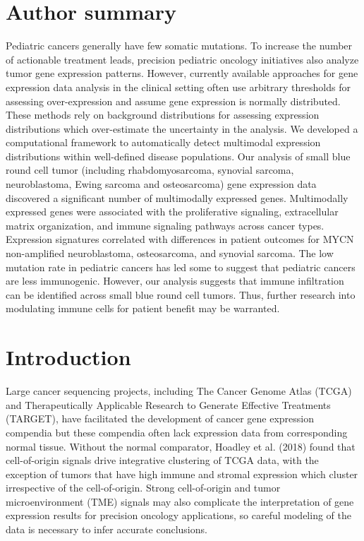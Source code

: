 \documentclass[10pt,letterpaper]{article}
\begin{document}
\section*{Author summary}
Pediatric cancers generally have few somatic mutations. To increase the number of actionable treatment leads, precision pediatric oncology initiatives also analyze tumor gene expression patterns. However, currently available approaches for gene expression data analysis in the clinical setting often use arbitrary thresholds for assessing over-expression and assume gene expression is normally distributed. These methods rely on background distributions for assessing expression distributions which over-estimate the uncertainty in the analysis. We developed a computational framework to automatically detect multimodal expression distributions within well-defined disease populations. Our analysis of small blue round cell tumor (including rhabdomyosarcoma, synovial sarcoma, neuroblastoma, Ewing sarcoma and osteosarcoma) gene expression data discovered a significant number of multimodally expressed genes. Multimodally expressed genes were associated with the proliferative signaling, extracellular matrix organization, and immune signaling pathways across cancer types. Expression signatures correlated with differences in patient outcomes for MYCN non-amplified neuroblastoma, osteosarcoma, and synovial sarcoma. The low mutation rate in pediatric cancers has led some to suggest that pediatric cancers are less immunogenic. However, our analysis suggests that immune infiltration can be identified across small blue round cell tumors. Thus, further research into modulating immune cells for patient benefit may be warranted.

\linenumbers

\section*{Introduction}
Large cancer sequencing projects, including The Cancer Genome Atlas (TCGA) and Therapeutically Applicable Research to Generate Effective Treatments (TARGET), have facilitated the development of cancer gene expression compendia \cite{vivianToilEnablesReproducible2017, pughGeneticLandscapeHighrisk2013, goldmanUCSCXenaPlatform2018, thecancergenomeatlasresearchnetworkCancerGenomeAtlas2013, newtonTumorMapExploringMolecular2017, vaskeComparativeTumorRNA2019} but these compendia often lack expression data from corresponding normal tissue. Without the normal comparator, Hoadley et al. (2018) found that cell-of-origin signals drive integrative clustering of TCGA data, with the exception of tumors that have high immune and stromal expression which cluster irrespective of the cell-of-origin. Strong cell-of-origin and tumor microenvironment (TME) signals may also complicate the interpretation of gene expression results for precision oncology applications, so careful modeling of the data is necessary to infer accurate conclusions. 
\end{document}

